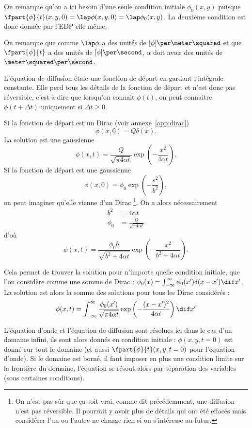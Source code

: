 On remarque qu'on a ici besoin d'une seule condition initiale $\phi_0(x, y)$
puisque $\fpart{\phi}{t}(x, y, 0) = \lap \phi(x, y, 0) = \lap \phi_0(x, y)$.
La deuxième condition est donc donnée par l'EDP elle même.

\begin{myrem}
  On remarque que comme $\lap \phi$ a des unités de $[\phi]\per\meter\squared$
  et que $\fpart{\phi}{t}$ a des unités de $[\phi]\per\second$,
  $\alpha$ doit avoir des unités de $\meter\squared\per\second$.
\end{myrem}

L'équation de diffusion étale une fonction de départ en gardant
l'intégrale constante.
Elle perd tous les détails de la fonction de départ et n'est donc
pas réversible, c'est à dire que lorsqu'on connait $\phi(t)$, on
peut connaitre $\phi(t + \Delta t)$ uniquement si $\Delta t \geq 0$.

Si la fonction de départ est un Dirac (voir annexe~\ref{app:dirac})
\[ \phi(x, 0) = Q \delta(x). \]
La solution est une gaussienne
\[ \phi(x, t) = \frac{Q}{\sqrt{\pi4\alpha t}}
\exp\left(-\frac{x^2}{4\alpha t}\right). \]
Si la fonction de départ est une gaussienne
\[ \phi(x, 0) = \phi_0 \exp\left(-\frac{s^2}{b^2}\right), \]
on peut imaginer qu'elle vienne d'un Dirac
\footnote{On n'est pas sûr que ça soit vrai,
comme dit précédemment, une diffusion n'est pas réversible.
Il pourrait y avoir plus de détails qui
ont été effacés mais considérer l'un ou l'autre ne change rien
si on s'intéresse au futur.}.
On a alors nécessairement
\begin{align*}
  b^2 & = 4\alpha t\\
  \phi_0 & = \frac{Q}{\sqrt{\pi4\alpha t}}
\end{align*}
d'où
\[ \phi(x, t) = \frac{\phi_0b}{\sqrt{b^2 + 4\alpha t}}
\exp\left(-\frac{x^2}{b^2 + 4\alpha t}\right). \]

Cela permet de trouver la solution pour n'importe quelle condition initiale,
que l'on considère comme une somme de Dirac :
$\phi_0(x) = \int_{-\infty}^\infty \phi_0(x')\delta(x-x') \dif x'$.
La solution est alors la somme des solutions pour tous les Dirac considérés :
\[\phi(x, t) =
    \int_{-\infty}^{\infty} \frac{\phi_0(x')}{\sqrt{\pi 4\alpha t}}
    \exp\left(-\frac{(x-x')^2}{4\alpha t}\right) \dif x'
\]

\begin{myrem}
L'équation d'onde et l'équation de diffusion sont résolues ici dans
le cas d'un domaine infini, ils sont alors donnés en condition initiale :
$\phi(x, y, t=0)$ est donné sur tout le domaine (et aussi
$\fpart{\phi}{t}(x, y, t=0)$ pour l'équation d'onde). Si le domaine
est borné, il faut imposer en plus une condition limite sur la frontière
du domaine, l'équation se résout alors par séparation des variables
(sous certaines conditions).
\end{myrem}

